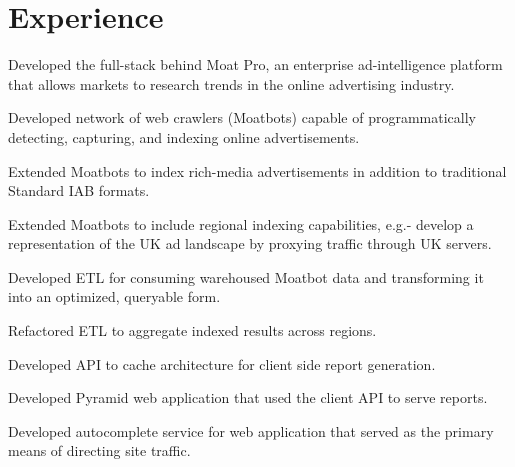 \documentclass[]{deedy-resume-openfont}
\begin{document}
\hfill
\begin{minipage}[t]{0.66\textwidth} 

    \section{Experience}

        \vspace{\topsep} %
        \begin{tightemize}
            \item
                Developed the full-stack behind Moat Pro, an enterprise
                ad-intelligence platform that allows markets to research trends
                in the online advertising industry.
            \item
                Developed network of web crawlers (Moatbots) capable of
                programmatically detecting, capturing, and indexing online
                advertisements.
            \item
                Extended Moatbots to index rich-media advertisements in
                addition to traditional Standard IAB formats.
            \item
                Extended Moatbots to include regional indexing capabilities,
                e.g.- develop a representation of the UK ad landscape by
                proxying traffic through UK servers.
            \item
                Developed ETL for consuming warehoused Moatbot data and
                transforming it into an optimized, queryable form.
            \item
                Refactored ETL to aggregate indexed results across regions.
            \item
                Developed API to cache architecture for client side report
                generation.
            \item
                Developed Pyramid web application that used the client API to
                serve reports.
            \item
                Developed autocomplete service for web application that served
                as the primary means of directing site traffic.
            \item

\end{tightemize}
\end{minipage}
\end{document}
